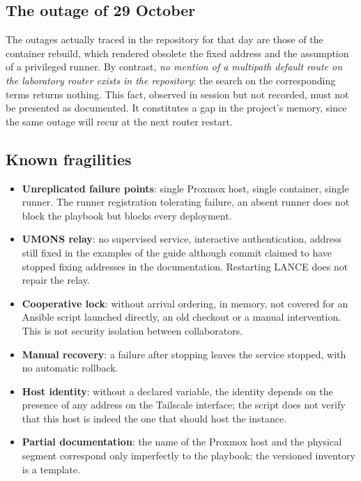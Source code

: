 \subsection{The outage of 29 October}

The outages actually traced in the repository for that day are those of the
container rebuild, which rendered obsolete the fixed address and the assumption of
a privileged runner. By contrast, \emph{no mention of a multipath default route on
the laboratory router exists in the repository}: the search on the corresponding
terms returns nothing. This fact, observed in session but not recorded, must not be
presented as documented. It constitutes a gap in the project's memory, since the
same outage will recur at the next router restart.

\subsection{Known fragilities}

\begin{itemize}
\item \textbf{Unreplicated failure points}: single Proxmox host, single container,
single runner. The runner registration tolerating failure, an absent runner does
not block the playbook but blocks every deployment.
\item \textbf{UMONS relay}: no supervised service, interactive authentication,
address still fixed in the examples of the guide although commit
 claimed to have stopped fixing addresses in the documentation.
Restarting LANCE does not repair the relay.
\item \textbf{Cooperative lock}: without arrival ordering, in memory, not covered
for an Ansible script launched directly, an old checkout or a manual
intervention. This is not security isolation between collaborators.
\item \textbf{Manual recovery}: a failure after stopping leaves the service
stopped, with no automatic rollback.
\item \textbf{Host identity}: without a declared variable, the identity depends on
the presence of any address on the Tailscale interface; the script does not verify
that this host is indeed the one that should host the instance.
\item \textbf{Partial documentation}: the name of the Proxmox host and the
physical segment correspond only imperfectly to the playbook; the versioned
inventory is a template.
\end{itemize}
